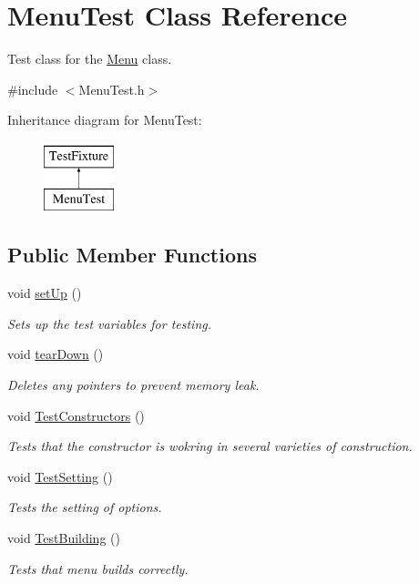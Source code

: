 \hypertarget{classMenuTest}{\section{Menu\-Test Class Reference}
\label{classMenuTest}
}


Test class for the \hyperlink{classMenu}{Menu} class.  




{\ttfamily \#include $<$Menu\-Test.\-h$>$}

Inheritance diagram for Menu\-Test\-:\begin{figure}[H]
\begin{center}
\leavevmode
\includegraphics[height=2.000000cm]{classMenuTest}
\end{center}
\end{figure}
\subsection*{Public Member Functions}
\begin{DoxyCompactItemize}
\item 
void \hyperlink{classMenuTest_a74a2e3b4575b68adc3df0dc0661097d5}{set\-Up} ()
\begin{DoxyCompactList}\small\item\em Sets up the test variables for testing. \end{DoxyCompactList}\item 
void \hyperlink{classMenuTest_aec456827673a21a3da9bc3853ec5b83b}{tear\-Down} ()
\begin{DoxyCompactList}\small\item\em Deletes any pointers to prevent memory leak. \end{DoxyCompactList}\item 
void \hyperlink{classMenuTest_a8937223971935c31487f46a00d294e97}{Test\-Constructors} ()
\begin{DoxyCompactList}\small\item\em Tests that the constructor is wokring in several varieties of construction. \end{DoxyCompactList}\item 
void \hyperlink{classMenuTest_ab0a87d1e4ee856ccf3af3cc6663845c4}{Test\-Setting} ()
\begin{DoxyCompactList}\small\item\em Tests the setting of options. \end{DoxyCompactList}\item 
void \hyperlink{classMenuTest_af74ddfe672fb68438b3e966c3736a763}{Test\-Building} ()
\begin{DoxyCompactList}\small\item\em Tests that menu builds correctly. \end{DoxyCompactList}\end{DoxyCompactItemize}
